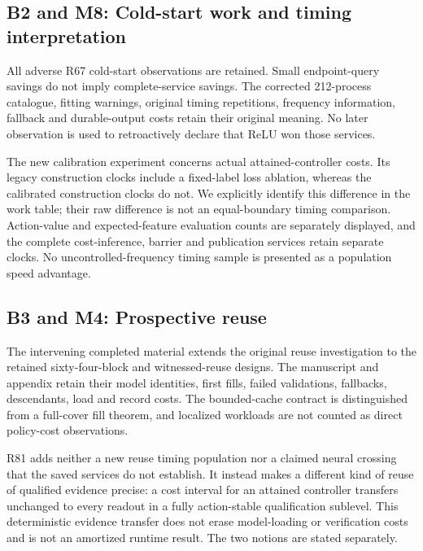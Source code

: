 \documentclass[ecta,nameyear,draft]{econsocart}
\begin{document}
\hypertarget{b2-and-m8-cold-start-work-and-timing-interpretation}{%
\subsection{B2 and M8: Cold-start work and timing
interpretation}\label{b2-and-m8-cold-start-work-and-timing-interpretation}}

All adverse R67 cold-start observations are retained. Small
endpoint-query savings do not imply complete-service savings. The
corrected 212-process catalogue, fitting warnings, original timing
repetitions, frequency information, fallback and durable-output costs
retain their original meaning. No later observation is used to
retroactively declare that ReLU won those services.

The new calibration experiment concerns actual attained-controller
costs. Its legacy construction clocks include a fixed-label loss
ablation, whereas the calibrated construction clocks do not. We
explicitly identify this difference in the work table; their raw
difference is not an equal-boundary timing comparison. Action-value and
expected-feature evaluation counts are separately displayed, and the
complete cost-inference, barrier and publication services retain
separate clocks. No uncontrolled-frequency timing sample is presented as
a population speed advantage.

\hypertarget{b3-and-m4-prospective-reuse}{%
\subsection{B3 and M4: Prospective
reuse}\label{b3-and-m4-prospective-reuse}}

The intervening completed material extends the original reuse
investigation to the retained sixty-four-block and witnessed-reuse
designs. The manuscript and appendix retain their model identities,
first fills, failed validations, fallbacks, descendants, load and record
costs. The bounded-cache contract is distinguished from a full-cover
fill theorem, and localized workloads are not counted as direct
policy-cost observations.

R81 adds neither a new reuse timing population nor a claimed neural
crossing that the saved services do not establish. It instead makes a
different kind of reuse of qualified evidence precise: a cost interval
for an attained controller transfers unchanged to every readout in a
fully action-stable qualification sublevel. This deterministic evidence
transfer does not erase model-loading or verification costs and is not
an amortized runtime result. The two notions are stated separately.
\end{document}
